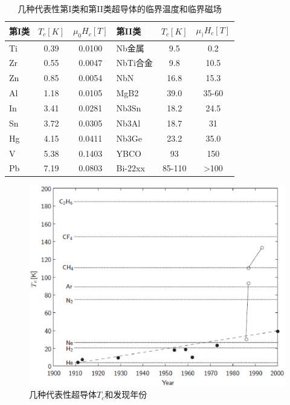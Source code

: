 \begin{table}[htbp]\small%
  \centering
  \caption{几种代表性第I类和第II类超导体的临界温度和临界磁场} \label{criticalparameters}
  \begin{tabular}{|l|c|c||l|c|c|}
    \hline
    第I类 & $T_c[K]$ & $\mu_0 H_c[T]$ & 第II类 & $T_c[K]$ & $\mu_)H_c[T]$ \\ \hline \hline
    Ti & 0.39 & 0.0100 & Nb金属 & 9.5 & 0.2 \\ \hline
    Zr & 0.55 & 0.0047 & NbTi合金 & 9.8 & 10.5 \\ \hline
    Zn & 0.85 & 0.0054 &NbN & 16.8 & 15.3 \\ \hline
    Al & 1.18 & 0.0105&MgB2 & 39.0 & 35-60\\ \hline
    In & 3.41 & 0.0281 & Nb3Sn & 18.2 & 24.5  \\ \hline
    Sn & 3.72 & 0.0305  & Nb3Al & 18.7 & 31\\ \hline
    Hg & 4.15 & 0.0411  & Nb3Ge & 23.2 & 35.0\\ \hline
    V & 5.38 & 0.1403& YBCO & 93 & 150\\ \hline
    Pb & 7.19 & 0.0803 & Bi-22xx & 85-110 & >100 \\
    \hline
  \end{tabular}
\end{table}


\begin{figure}%
  \centering
 \includegraphics[scale=0.6]{chpt1/figs/fig1.4.eps}
  \caption{
几种代表性超导体$T_c$和发现年份
}\label{tcvsyear}
\end{figure}


